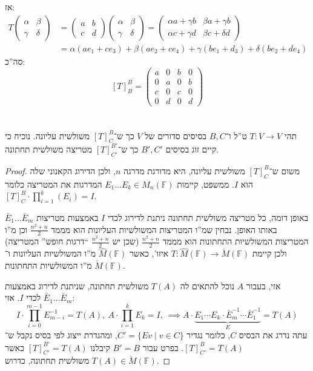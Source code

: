 \documentclass[]{article}
\newcommand\F         {\mathbb{F}}
\newcommand\co        {\colon}
\newcommand\pms[1]    {\begin{pmatrix}
        #1
\end{pmatrix}}
\newcommand\ag        {\alpha}
\newcommand\bg        {\beta}
\newcommand\cg        {\gamma}
\newcommand\dg        {\delta}
\newcommand\op    {^{-1}}
\theoremstyle{definition}
\begin{document}
\begin{enumerate}[(A)]
        אז: 
        \begin{align*}
            T\pms{\ag & \bg \\ \cg & \dg} &= \pms{a & b \\ c& d}\pms{\ag & \bg \\ \cg & \dg} = \pms{\ag a + \cg b & \bg a + \cg b \\ \ag c + \cg d & \bg c + \dg d} \\
            &= \ag (ae_1 + ce_3) + \bg(ae_2 + ce_4) + \cg(be_1 + d_3) + \dg(be_2 + de_4)
        \end{align*}
        סה''כ: 
        \[ [T]^B_B = \pms{a & 0 & b & 0 \\ 0 & a & 0 & b \\ c & 0 & c & 0 \\ 0 & d & 0 &d} \]
    \end{enumerate}
    
    \section{}
    תהי $T \co V \to V$ ט''ל ו־$B, C$ בסיסים סדורים של $V$ כך ש־$[T]^B_C$ משולשית עליונה. נוכיח כי קיים זוג בסיסים $B', C'$ כך ש־$[T]^{B'}_{C'}$ מטריצה משולשית תחתונה. 
    \begin{proof}
        משום ש־$[T]_C^B$ משולשית עליונה, היא מדורגת מדרגה $n$, ולכן הדירוג הקאנוני שלה הוא $I$. ממשפט, קיימות $E_1 \dots E_k \in M_n(\F)$ המדרגות את המטריצה כלומר $[T]_C^B \cdot \prod_{i = 1}^{k} (E_i) = I$. 
        
        באופן דומה, כל מטריצה משולשית תחתונה ניתנת לדירוג לכדי $I$ באמצעות מטריצות $\bar E_1 \dots \bar E_m$ באותו האופן. נבחין שמ''ו המטריצות המשולשיות העליונות הוא מממד $\frac{n^2 + n}{2}$ וכן מ''ו המטריצות המשולשיות התחתונות הוא מממד $\frac{n^2 + n}{2}$ (שכן יש $\frac{n^2 + n}{2}$ ``דרגות חופש'' המטריצה) ולכן קיימת $T \co \hat M(\F) \to \check M(\F)$ איזו', כאשר $\hat M(\F)$ מ''ו המשולשיות העליונות ו־$\check M(\F)$ מ''ו המשולשיות התחתונות. 
        
        אזי, בעבור $A$ נוכל להתאים לה $T(A)$ משולשית תחתונה, שניתנת לדירוג באמצעות $\bar E_1 \dots \bar E_m$ לכדי $I$. אזי: 
        \[ I \cdot \prod_{i = 0}^{m - 1}E_{m - i}\op = T(A), \ A \cdot \prod_{i = 1}^{k}E_k = I, \ \implies A \cdot \underbrace{E_1 \cdots E_k \cdot \bar E_m\op \cdots \bar E_1\op}_{E} = T(A) \]
        עתה נדרג את הבסיס $C$, כלומר נגדיר $C' = \{E v \mid v \in C\}$, ומהגדרת ייצוג לפי בסיס נקבל ש־$[T]^B_{C'} = T(A)$. בפרט עבור $B' = B$ קיבלנו $[T]_{C'}^{B'} = T(A)$ כאשר $T(A) \in \check M(\F)$ משולשית תחתונה, כדרוש. 
    \end{proof}
    
\end{document}
